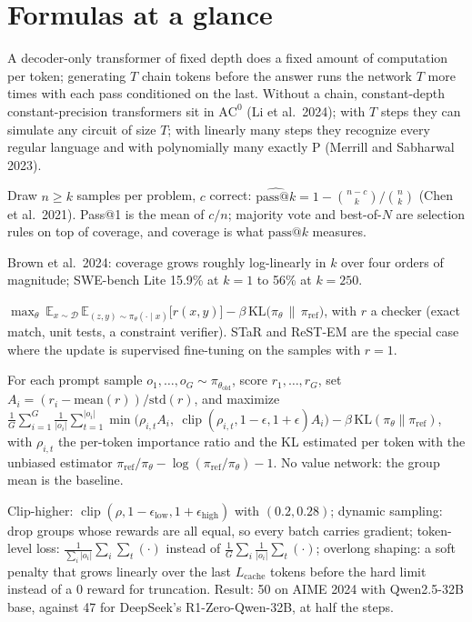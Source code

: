 \documentclass[11pt,letterpaper]{article}
\makeatletter
\newcommand{\passk}{\mathrm{pass}@k}
\newcommand{\E}{\mathbb{E}}
\DeclareMathOperator{\clip}{clip}
\makeatother
\begin{document}
\clearpage
\section{Formulas at a glance}

\begin{description}[leftmargin=0pt,labelindent=0pt,itemsep=6pt,font=\normalfont\bfseries\sffamily]\sloppy
\item[Serial computation.] A decoder-only transformer of fixed depth does a fixed amount of computation per token; generating $T$ chain tokens before the answer runs the network $T$ more times with each pass conditioned on the last. Without a chain, constant-depth constant-precision transformers sit in $\mathrm{AC}^0$ (Li et al.\ 2024); with $T$ steps they can simulate any circuit of size $T$; with linearly many steps they recognize every regular language and with polynomially many exactly P (Merrill and Sabharwal 2023).
\item[Pass at $k$ (unbiased estimator).] Draw $n\ge k$ samples per problem, $c$ correct: $\widehat{\passk}=1-\binom{n-c}{k}/\binom{n}{k}$ (Chen et al.\ 2021). Pass@1 is the mean of $c/n$; majority vote and best-of-$N$ are selection rules on top of coverage, and coverage is what $\passk$ measures.
\item[Coverage scaling.] Brown et al.\ 2024: coverage grows roughly log-linearly in $k$ over four orders of magnitude; SWE-bench Lite 15.9\% at $k=1$ to 56\% at $k=250$.
\item[RLVR objective.] $\max_\theta\ \E_{x\sim\mathcal D}\,\E_{(z,y)\sim\pi_\theta(\cdot\mid x)}\bigl[r(x,y)\bigr]-\beta\,\mathrm{KL}\bigl(\pi_\theta\,\|\,\pi_{\text{ref}}\bigr)$, with $r$ a checker (exact match, unit tests, a constraint verifier). STaR and ReST-EM are the special case where the update is supervised fine-tuning on the samples with $r=1$.
\item[GRPO (Shao et al.\ 2024).] For each prompt sample $o_1,\dots,o_G\sim\pi_{\theta_{\text{old}}}$, score $r_1,\dots,r_G$, set $A_i=(r_i-\mathrm{mean}(r))/\mathrm{std}(r)$, and maximize
$\frac1G\sum_{i=1}^{G}\frac{1}{|o_i|}\sum_{t=1}^{|o_i|}\min\bigl(\rho_{i,t}A_i,\ \clip(\rho_{i,t},1-\epsilon,1+\epsilon)A_i\bigr)-\beta\,\mathrm{KL}(\pi_\theta\|\pi_{\text{ref}})$, with $\rho_{i,t}$ the per-token importance ratio and the KL estimated per token with the unbiased estimator $\pi_{\text{ref}}/\pi_\theta-\log(\pi_{\text{ref}}/\pi_\theta)-1$. No value network: the group mean is the baseline.
\item[DAPO (Yu et al.\ 2025).] Clip-higher: $\clip(\rho,1-\epsilon_{\text{low}},1+\epsilon_{\text{high}})$ with $(0.2,0.28)$; dynamic sampling: drop groups whose rewards are all equal, so every batch carries gradient; token-level loss: $\frac{1}{\sum_i|o_i|}\sum_i\sum_t(\cdot)$ instead of $\frac1G\sum_i\frac{1}{|o_i|}\sum_t(\cdot)$; overlong shaping: a soft penalty that grows linearly over the last $L_{\text{cache}}$ tokens before the hard limit instead of a $0$ reward for truncation. Result: 50 on AIME 2024 with Qwen2.5-32B base, against 47 for DeepSeek's R1-Zero-Qwen-32B, at half the steps.

\end{description}
\end{document}
